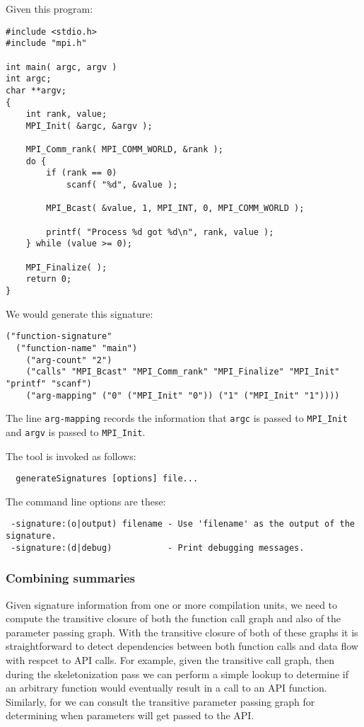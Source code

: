 \documentclass{article}
\begin{document}
Given this program:
\begin{verbatim}
#include <stdio.h>
#include "mpi.h"

int main( argc, argv )
int argc;
char **argv;
{
    int rank, value;
    MPI_Init( &argc, &argv );

    MPI_Comm_rank( MPI_COMM_WORLD, &rank );
    do {
        if (rank == 0)
            scanf( "%d", &value );

        MPI_Bcast( &value, 1, MPI_INT, 0, MPI_COMM_WORLD );

        printf( "Process %d got %d\n", rank, value );
    } while (value >= 0);

    MPI_Finalize( );
    return 0;
}
\end{verbatim}

We would generate this signature:
\begin{verbatim}
("function-signature"
  ("function-name" "main")
    ("arg-count" "2")
    ("calls" "MPI_Bcast" "MPI_Comm_rank" "MPI_Finalize" "MPI_Init" "printf" "scanf")
    ("arg-mapping" ("0" ("MPI_Init" "0")) ("1" ("MPI_Init" "1"))))
\end{verbatim}

The line \verb|arg-mapping| records the information that \verb|argc| is passed
to \verb|MPI_Init| and \verb|argv| is passed to \verb|MPI_Init|.

The tool is invoked as follows:
\begin{verbatim}
  generateSignatures [options] file...
\end{verbatim}

The command line options are these:

\begin{verbatim}
 -signature:(o|output) filename - Use 'filename' as the output of the signature.
 -signature:(d|debug)           - Print debugging messages.
\end{verbatim}


\subsubsection{Combining summaries}

Given signature information from one or more compilation units, we need to
compute the transitive closure of both the function call graph and also of the
parameter passing graph. With the transitive closure of both of these graphs it
is straightforward to detect dependencies between both function calls and data
flow with respcet to API calls. For example, given the transitive call graph,
then during the skeletonization pass we can perform a simple lookup to
determine if an arbitrary function would eventually result in a call to an API
function. Similarly, for we can consult the transitive parameter passing graph
for determining when parameters will get passed to the API.
\end{document}
